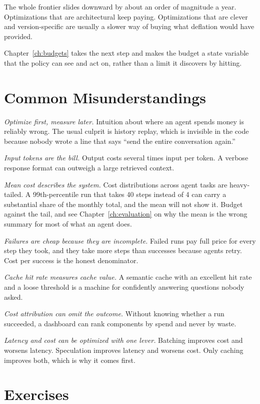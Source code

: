 \documentclass[11pt]{book}
\begin{document}
The whole frontier slides downward by about an order of magnitude a year. Optimizations that are architectural keep paying. Optimizations that are clever and version-specific are usually a slower way of buying what deflation would have provided.

Chapter~\ref{ch:budgets} takes the next step and makes the budget a state variable that the policy can see and act on, rather than a limit it discovers by hitting.

\section{Common Misunderstandings}

\textit{Optimize first, measure later.} Intuition about where an agent spends money is reliably wrong. The usual culprit is history replay, which is invisible in the code because nobody wrote a line that says ``send the entire conversation again.''

\textit{Input tokens are the bill.} Output costs several times input per token. A verbose response format can outweigh a large retrieved context.

\textit{Mean cost describes the system.} Cost distributions across agent tasks are heavy-tailed. A 99th-percentile run that takes 40 steps instead of 4 can carry a substantial share of the monthly total, and the mean will not show it. Budget against the tail, and see Chapter~\ref{ch:evaluation} on why the mean is the wrong summary for most of what an agent does.

\textit{Failures are cheap because they are incomplete.} Failed runs pay full price for every step they took, and they take more steps than successes because agents retry. Cost per success is the honest denominator.

\textit{Cache hit rate measures cache value.} A semantic cache with an excellent hit rate and a loose threshold is a machine for confidently answering questions nobody asked.

\textit{Cost attribution can omit the outcome.} Without knowing whether a run succeeded, a dashboard can rank components by spend and never by waste.

\textit{Latency and cost can be optimized with one lever.} Batching improves cost and worsens latency. Speculation improves latency and worsens cost. Only caching improves both, which is why it comes first.

\section*{Exercises}
\end{document}
